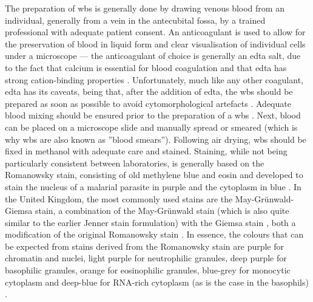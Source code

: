 The preparation of \ac{wbs} is generally done by drawing venous blood from an individual, generally from a vein in the antecubital fossa, by a trained professional with adequate patient consent. An anticoagulant is used to allow for the preservation of blood in liquid form and clear visualisation of individual cells under a microscope --- the anticoagulant of choice is generally an \ac{edta} salt, due to the fact that calcium is essential for blood coagulation and that \ac{edta} has strong cation-binding properties \cite{Oh2007-yr}. Unfortunately, much like any other coagulant, \ac{edta} has its caveats, being that, after the addition of \ac{edta}, the \ac{wbs} should be prepared as soon as possible to avoid cytomorphological artefacts \cite{Oh2007-yr,Bain2014-oc}. Adequate blood mixing should be ensured prior to the preparation of a \ac{wbs} \cite{Ashenden2012-eu}. Next, blood can be placed on a microscope slide and manually spread or smeared (which is why \ac{wbs} are also known as ”blood smears”). Following air drying, \ac{wbs} should be fixed in methanol with adequate care \cite{Bain2014-oc} and stained. Staining, while not being particularly consistent between laboratories, is generally based on the Romanowsky stain, consisting of old methylene blue and eosin and developed to stain the nucleus of a malarial parasite in purple and the cytoplasm in blue \cite{England1976-ff}. In the United Kingdom, the most commonly used stains are the May-Grünwald-Giemsa stain, a combination of the May-Grünwald stain (which is also quite similar to the earlier Jenner stain formulation) \cite{Krafts2011-xh} with the Giemsa stain \cite{Giemsa1904-dm}, both a modification of the original Romanowsky stain \cite{Bain2014-oc}. In essence, the colours that can be expected from stains derived from the Romanowsky stain are purple for chromatin and nuclei, light purple for neutrophilic granules, deep purple for basophilic granules, orange for eosinophilic granules, blue-grey for monocytic cytoplasm and deep-blue for RNA-rich cytoplasm (as is the case in the basophils) \cite{Bain2014-oc}.

